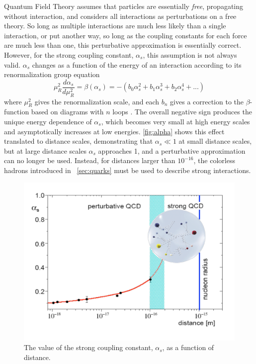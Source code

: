 
Quantum Field Theory assumes that particles are essentially \textit{free}, propagating without interaction, and considers all interactions as perturbations on a free theory. So long as multiple interactions are much less likely than a single interaction, or put another way, so long as the coupling constants for each force are much less than one, this perturbative approximation is essentially correct. However, for the strong coupling constant, $\alpha_s$, this assumption is not always valid. $\alpha_s$ changes as a function of the energy of an interaction according to its renormalization group equation
%
\begin{equation}
\mu^2_R \frac{d\alpha_s}{d\mu^2_R} = \beta(\alpha_s) = -(b_0\alpha_s^2 + b_1\alpha_s^3 + b_2\alpha_s^4 + ... )
\end{equation}
%
where $\mu^2_R$ gives the renormalization scale, and each $b_n$ gives a correction to the $\beta$-function based on diagrams with $n$ loops \cite{Agashe:2014kda}. The overall negative sign produces the unique energy dependence of $\alpha_s$, which becomes very small at high energy scales and asymptotically increases at low energies. \autoref{fig:alpha} shows this effect translated to distance scales, demonstrating that $\alpha_s\ll1$ at small distance scales, but at large distance scales $\alpha_s$ approaches 1, and a perturbative approximation can no longer be used. Instead, for distances larger than $10^{-16}$, the colorless hadrons introduced in ~\autoref{sec:quarks} must be used to describe strong interactions.

\begin{centering}
\begin{figure}[!htb]
\myfloatalign
\includegraphics[width=.85\linewidth]{figures/theory/strong_coupling.png}
\caption{The value of the strong coupling constant, $\alpha_s$, as a function of distance. \cite{Messchendorp:2013ysj}}
\label{fig:alpha}
\end{figure}
\end{centering}

